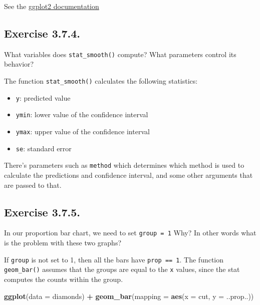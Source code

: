 \documentclass[]{book}
\newenvironment{Shaded}{\begin{snugshade}}{\end{snugshade}}
\newcommand{\DataTypeTok}[1]{\textcolor[rgb]{0.13,0.29,0.53}{#1}}
\newcommand{\KeywordTok}[1]{\textcolor[rgb]{0.13,0.29,0.53}{\textbf{#1}}}
\newcommand{\NormalTok}[1]{#1}
\newcommand{\OperatorTok}[1]{\textcolor[rgb]{0.81,0.36,0.00}{\textbf{#1}}}
\newcommand{\StringTok}[1]{\textcolor[rgb]{0.31,0.60,0.02}{#1}}
\providecommand{\tightlist}{%
  \setlength{\itemsep}{0pt}\setlength{\parskip}{0pt}}
\theoremstyle{plain}
\theoremstyle{remark}
\theoremstyle{definition}
\theoremstyle{definition}
\theoremstyle{definition}
\theoremstyle{remark}
\begin{document}
See the \href{http://docs.ggplot2.org/current/}{ggplot2 documentation}

\hypertarget{exercise-3.7.4.}{%
\subsection*{\texorpdfstring{Exercise
{3.7.4}.}{Exercise 3.7.4.}}\label{exercise-3.7.4.}}

What variables does \texttt{stat\_smooth()} compute? What parameters
control its behavior?

The function \texttt{stat\_smooth()} calculates the following
statistics:

\begin{itemize}
\tightlist
\item
  \texttt{y}: predicted value
\item
  \texttt{ymin}: lower value of the confidence interval
\item
  \texttt{ymax}: upper value of the confidence interval
\item
  \texttt{se}: standard error
\end{itemize}

There's parameters such as \texttt{method} which determines which method
is used to calculate the predictions and confidence interval, and some
other arguments that are passed to that.

\hypertarget{exercise-3.7.5.}{%
\subsection*{\texorpdfstring{Exercise
{3.7.5}.}{Exercise 3.7.5.}}\label{exercise-3.7.5.}}

In our proportion bar chart, we need to set \texttt{group\ =\ 1} Why? In
other words what is the problem with these two graphs?

If \texttt{group} is not set to 1, then all the bars have
\texttt{prop\ ==\ 1}. The function \texttt{geom\_bar()} assumes that the
groups are equal to the \texttt{x} values, since the stat computes the
counts within the group.

\begin{Shaded}
\begin{Highlighting}[]
\KeywordTok{ggplot}\NormalTok{(}\DataTypeTok{data =}\NormalTok{ diamonds) }\OperatorTok{+}
\StringTok{  }\KeywordTok{geom_bar}\NormalTok{(}\DataTypeTok{mapping =} \KeywordTok{aes}\NormalTok{(}\DataTypeTok{x =}\NormalTok{ cut, }\DataTypeTok{y =}\NormalTok{ ..prop..))}
\end{Highlighting}
\end{Shaded}
\end{document}
